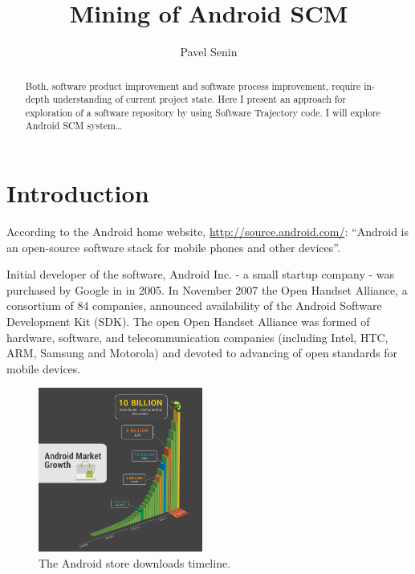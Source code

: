 \documentclass[a4paper,10pt]{report}
\numberwithin{equation}{subsection}
\begin{document}
\title{Mining of Android SCM}
\author{Pavel Senin}

\maketitle

\begin{abstract}
Both, software product improvement and software process improvement, require in-depth understanding 
of current project state. Here I present an approach for exploration of a software repository by 
using Software Trajectory code. I will explore Android SCM system\ldots
\end{abstract}

\section{Introduction}
According to the Android home website, \url{http://source.android.com/}: ``Android is an 
open-source software stack for mobile phones and other devices''.

Initial developer of the software, Android Inc. - a small startup company - was purchased by Google 
in in 2005. In November 2007 the Open Handset Alliance, a consortium of 84 companies, announced 
availability of the Android Software Development Kit (SDK). The open Open Handset Alliance was formed 
of hardware, software, and telecommunication companies (including Intel, HTC, ARM, Samsung and Motorola)
and devoted to advancing of open standards for mobile devices. 

\begin{figure}
   \begin{center}
   \includegraphics[scale=0.3,width=0.48\textwidth]{graph_only_3}
   \end{center}
   \caption{The Android store downloads timeline.}
   \label{fig:android_downloads}
\end{figure}
\end{document}
